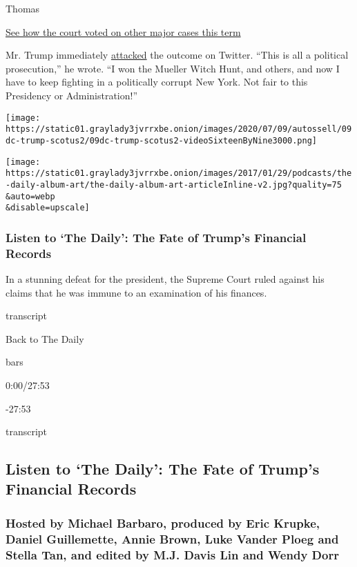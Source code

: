 Thomas

\href{https://www.nytimes3xbfgragh.onion/interactive/2020/06/15/us/supreme-court-major-cases-2020.html}{See
how the court voted on other major cases this term}

Mr. Trump immediately
\href{https://twitter.com/realDonaldTrump/status/1281236214646034432}{attacked}
the outcome on Twitter. ``This is all a political prosecution,'' he
wrote. ``I won the Mueller Witch Hunt, and others, and now I have to
keep fighting in a politically corrupt New York. Not fair to this
Presidency or Administration!''

\texttt{[image: https://static01.graylady3jvrrxbe.onion/images/2020/07/09/autossell/09dc-trump-scotus2/09dc-trump-scotus2-videoSixteenByNine3000.png]}

\texttt{[image: https://static01.graylady3jvrrxbe.onion/images/2017/01/29/podcasts/the-daily-album-art/the-daily-album-art-articleInline-v2.jpg?quality=75\\\&auto=webp\\\&disable=upscale]}

\hypertarget{listen-to-the-daily-the-fate-of-trumps-financial-records}{%
\subsubsection{Listen to `The Daily': The Fate of Trump's Financial
Records}\label{listen-to-the-daily-the-fate-of-trumps-financial-records}}

In a stunning defeat for the president, the Supreme Court ruled against
his claims that he was immune to an examination of his finances.

transcript

Back to The Daily

bars

0:00/27:53

-27:53

transcript

\hypertarget{listen-to-the-daily-the-fate-of-trumps-financial-records-1}{%
\subsection{Listen to `The Daily': The Fate of Trump's Financial
Records}\label{listen-to-the-daily-the-fate-of-trumps-financial-records-1}}

\hypertarget{hosted-by-michael-barbaro-produced-by-eric-krupke-daniel-guillemette-annie-brown-luke-vander-ploeg-and-stella-tan-and-edited-by-mj-davis-lin-and-wendy-dorr}{%
\subsubsection{Hosted by Michael Barbaro, produced by Eric Krupke,
Daniel Guillemette, Annie Brown, Luke Vander Ploeg and Stella Tan, and
edited by M.J. Davis Lin and Wendy
Dorr}\label{hosted-by-michael-barbaro-produced-by-eric-krupke-daniel-guillemette-annie-brown-luke-vander-ploeg-and-stella-tan-and-edited-by-mj-davis-lin-and-wendy-dorr}}

